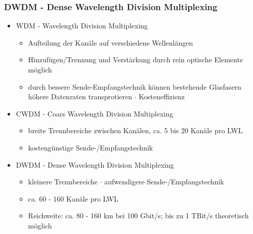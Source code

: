 \subsubsection{DWDM - Dense Wavelength Division Multiplexing}
\begin{itemize}
	\item WDM - Wavelength Division Multiplexing
	\begin{itemize}
		\item Aufteilung der Kanäle auf verschiedene Wellenlängen
		\item Hinzufügen/Trennung und Verstärkung durch rein optische Elemente möglich
		\item durch bessere Sende-Empfangstechnik können bestehende Glasfasern höhere Datenraten transprotieren \(\cdot\) Kosteneffizienz
	\end{itemize}
	\item CWDM - Coars Wavelength Division Multiplexing
	\begin{itemize}
		\item breite Trennbereiche zwischen Kanälen, ca. 5 bis 20 Kanäle pro LWL
		\item kostengünstige Sende-/Empfangstechnik
	\end{itemize}
	\item DWDM - Dense Wavelength Division Multiplexing
	\begin{itemize}
		\item kleinere Trennbereiche \(\cdot\) aufwendigere Sende-/Empfangstechnik
		\item ca. 60 - 160 Kanäle pro LWL
		\item Reichweite: ca. 80 - 160 km bei 100 Gbit/s; bis zu 1 TBit/s theoretisch möglich
	\end{itemize}
\end{itemize}